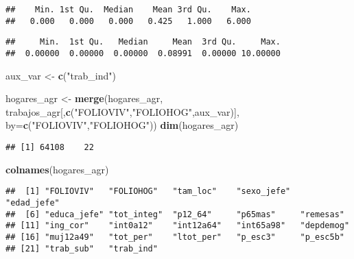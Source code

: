 \documentclass[11pt,]{article}
\newenvironment{Shaded}{\begin{snugshade}}{\end{snugshade}}
\newcommand{\KeywordTok}[1]{\textcolor[rgb]{0.13,0.29,0.53}{\textbf{#1}}}
\newcommand{\DataTypeTok}[1]{\textcolor[rgb]{0.13,0.29,0.53}{#1}}
\newcommand{\StringTok}[1]{\textcolor[rgb]{0.31,0.60,0.02}{#1}}
\newcommand{\OperatorTok}[1]{\textcolor[rgb]{0.81,0.36,0.00}{\textbf{#1}}}
\newcommand{\NormalTok}[1]{#1}
\begin{document}
\begin{verbatim}
##    Min. 1st Qu.  Median    Mean 3rd Qu.    Max. 
##   0.000   0.000   0.000   0.425   1.000   6.000
\end{verbatim}

\begin{Shaded}
\end{Shaded}

\begin{verbatim}
##     Min.  1st Qu.   Median     Mean  3rd Qu.     Max. 
##  0.00000  0.00000  0.00000  0.08991  0.00000 10.00000
\end{verbatim}

\begin{Shaded}
\begin{Highlighting}[]
\NormalTok{aux_var <-}\StringTok{ }\KeywordTok{c}\NormalTok{(}\StringTok{"trab_ind"}\NormalTok{)}

\NormalTok{hogares_agr <-}\StringTok{ }\KeywordTok{merge}\NormalTok{(hogares_agr,}
\NormalTok{                     trabajos_agr[,}\KeywordTok{c}\NormalTok{(}\StringTok{"FOLIOVIV"}\NormalTok{,}\StringTok{"FOLIOHOG"}\NormalTok{,aux_var)],}
                     \DataTypeTok{by=}\KeywordTok{c}\NormalTok{(}\StringTok{"FOLIOVIV"}\NormalTok{,}\StringTok{"FOLIOHOG"}\NormalTok{))}
\KeywordTok{dim}\NormalTok{(hogares_agr)}
\end{Highlighting}
\end{Shaded}

\begin{verbatim}
## [1] 64108    22
\end{verbatim}

\begin{Shaded}
\begin{Highlighting}[]
\KeywordTok{colnames}\NormalTok{(hogares_agr)}
\end{Highlighting}
\end{Shaded}

\begin{verbatim}
##  [1] "FOLIOVIV"   "FOLIOHOG"   "tam_loc"    "sexo_jefe"  "edad_jefe" 
##  [6] "educa_jefe" "tot_integ"  "p12_64"     "p65mas"     "remesas"   
## [11] "ing_cor"    "int0a12"    "int12a64"   "int65a98"   "depdemog"  
## [16] "muj12a49"   "tot_per"    "ltot_per"   "p_esc3"     "p_esc5b"   
## [21] "trab_sub"   "trab_ind"
\end{verbatim}
\end{document}
